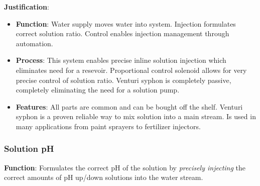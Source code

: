 \documentclass{report}
\begin{document}
\textbf{Justification}: 
\begin{itemize}
    \item \textbf{Function}: Water supply moves water into system. Injection formulates correct solution ratio. Control enables injection management through automation.
    \item \textbf{Process}: This system enables precise inline solution injection which eliminates need for a resevoir. Proportional control solenoid allows for very precise control of solution ratio. Venturi syphon is completely passive, completely eliminating the need for a solution pump. 
    \item \textbf{Features}: All parts are common and can be bought off the shelf. Venturi syphon is a proven reliable way to mix solution into a main stream. Is used in many applications from paint sprayers to fertilizer injectors.
\end{itemize}

\newpage


\subsubsection{Solution pH}
\label{sec:ph}

\textbf{Function}: Formulates the correct pH of the solution by \textit{precisely injecting} the correct amounts of pH up/down solutions into the water stream.
\end{document}
